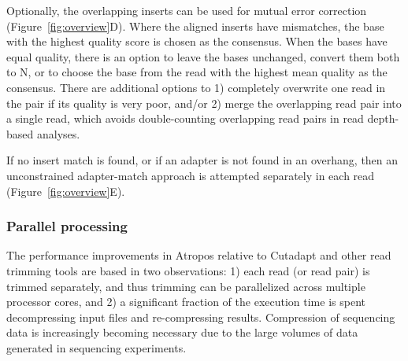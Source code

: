 \documentclass[fleqn,10pt,lineno]{wlpeerj} %
\begin{document}
Optionally, the overlapping inserts can be used for mutual error correction (Figure~\ref{fig:overview}D). Where the aligned inserts have mismatches, the base with the highest quality score is chosen as the consensus. When the bases have equal quality, there is an option to leave the bases unchanged, convert them both to N, or to choose the base from the read with the highest mean quality as the consensus. There are additional options to 1) completely overwrite one read in the pair if its quality is very poor, and/or 2) merge the overlapping read pair into a single read, which avoids double-counting overlapping read pairs in read depth-based analyses.

If no insert match is found, or if an adapter is not found in an overhang, then an unconstrained adapter-match approach is attempted separately in each read (Figure~\ref{fig:overview}E).

\subsubsection{Parallel processing}\label{parallel}

The performance improvements in Atropos relative to Cutadapt and other read trimming tools are based in two observations: 1) each read (or read pair) is trimmed separately, and thus trimming can be parallelized across multiple processor cores, and 2) a significant fraction of the execution time is spent decompressing input files and re-compressing results. Compression of sequencing data is increasingly becoming necessary due to the large volumes of data generated in sequencing experiments.
\end{document}
